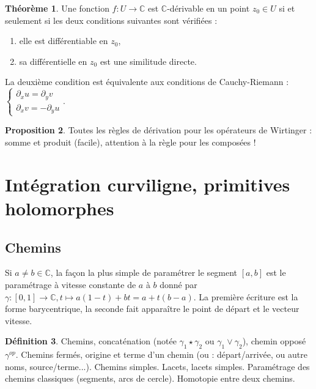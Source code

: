 \documentclass[11pt,a4paper]{article}
\newcommand{\C}{\mathbb{C}}
\theoremstyle{definition}
\newtheorem{theoreme}{Th\'eor\`eme}[section]
\newtheorem{proposition}[theoreme]{Proposition}
\newtheorem{definitions}[theoreme]{D\'efinition}
\theoremstyle{plain}
\begin{document}
\begin{theoreme}
Une fonction $f:U\to \C$ est $\C$-dérivable en un point $z_0 \in U$ si et seulement si les deux conditions suivantes sont vérifiées :
\begin{enumerate}
\item elle est différentiable en $z_0$,
\item sa différentielle en $z_0$ est une similitude directe.
\end{enumerate}
\end{theoreme}

La deuxième condition est équivalente aux conditions de Cauchy-Riemann : $\begin{cases}\partial_x u = \partial_y v \\ \partial_x v = -\partial_y u\end{cases}$.

\begin{proposition}
Toutes les règles de dérivation pour les opérateurs de Wirtinger : somme et produit (facile), attention à la règle pour les composées !
\end{proposition}



\section{Intégration curviligne, primitives holomorphes}
\subsection{Chemins}
\begin{remarque}
Si $a \neq b \in\C$, la façon la plus simple de paramétrer le segment $[a,b]$ est le paramétrage à vitesse constante de $a$ à $b$ donné par $\gamma : [0,1]\to \C, t\mapsto a(1-t)+bt = a + t(b-a)$.
La première écriture est la forme barycentrique, la seconde fait apparaître le point de départ et le vecteur vitesse.
\end{remarque}

\begin{definitions}
Chemins, concaténation (notée $\gamma_1\star \gamma_2$ ou $\gamma_1\vee \gamma_2$), chemin opposé $\gamma^{op}$. Chemins fermés, origine et terme d'un chemin (ou : départ/arrivée, ou autre noms, source/terme...).
Chemins simples. 
Lacets, lacets simples.
Paramétrage des chemins classiques (segments, arcs de cercle). Homotopie entre deux chemins.
\end{definitions}
\end{document}

